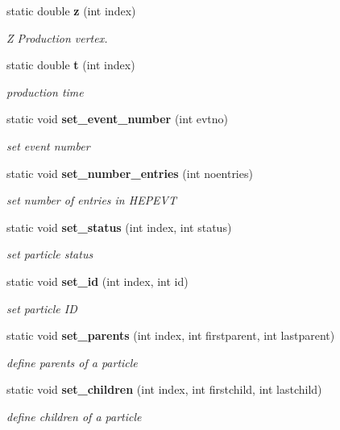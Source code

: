 \begin{CompactItemize}
static double {\bf z} (int index)
\begin{CompactList}\small\item\em Z Production vertex. \item\end{CompactList}\item 
static double {\bf t} (int index)
\begin{CompactList}\small\item\em production time \item\end{CompactList}\item 
static void {\bf set\_\-event\_\-number} (int evtno)
\begin{CompactList}\small\item\em set event number \item\end{CompactList}\item 
static void {\bf set\_\-number\_\-entries} (int noentries)
\begin{CompactList}\small\item\em set number of entries in HEPEVT \item\end{CompactList}\item 
static void {\bf set\_\-status} (int index, int status)
\begin{CompactList}\small\item\em set particle status \item\end{CompactList}\item 
static void {\bf set\_\-id} (int index, int id)
\begin{CompactList}\small\item\em set particle ID \item\end{CompactList}\item 
static void {\bf set\_\-parents} (int index, int firstparent, int lastparent)
\begin{CompactList}\small\item\em define parents of a particle \item\end{CompactList}\item 
static void {\bf set\_\-children} (int index, int firstchild, int lastchild)
\begin{CompactList}\small\item\em define children of a particle \item\end{CompactList}\item 

\end{CompactItemize}
